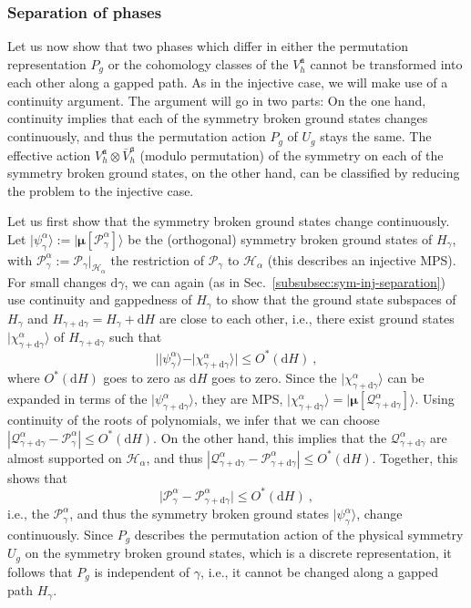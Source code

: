 \documentclass[twocolumn,superscriptaddress,prb,linenumbers]{revtex4-1}
\newcommand{\ket}[1]{\vert#1\rangle}
\newcommand{\MPS}[1]{| {\bm\mu}[#1]\rangle}
\newcommand{\mc}[1]{\mathcal{#1}}
\newcommand{\mf}[1]{\mathfrak{#1}}
\newcommand{\dd}{\mathrm{d}}
\newcommand{\sss}[1]{\subsubsection{#1}}
\begin{document}
\sss{Separation of phases}%
Let us now show that two phases which differ in either the permutation
representation $P_g$ or the cohomology classes of the $V_h^{\mf a}$
cannot be transformed into each other along a gapped path. As in the
injective case, we will make use of a continuity argument. The argument
will go in two parts: On the one hand, continuity implies that each of the
symmetry broken ground states changes continuously, and thus the
permutation action $P_g$ of $U_g$ stays the same. The effective action
$ V_h^{\mf a}\otimes \bar V_h^{\mf a}$ (modulo
permutation) of the symmetry
on each of the symmetry broken ground states, on the other hand, can be
classified by reducing the problem to the injective case.

Let us first show that the symmetry broken ground states change
continuously.  Let $\ket{\psi^\alpha_\gamma}:=\MPS{\mc P^\alpha_\gamma}$ be
the (orthogonal) symmetry broken ground states of $H_\gamma$, with $\mc
    P_\gamma^\alpha:=\mc P_\gamma\vert_{\mc H_\alpha}$ the restriction of $\mc
    P_\gamma$ to $\mc H_\alpha$ (this describes an injective MPS). For small
changes $\dd\gamma$, we can again (as in
Sec.~\ref{subsubsec:sym-inj-separation}) use continuity and gappedness of
$H_\gamma$ to show that the ground state subspaces of $H_\gamma$ and
$H_{\gamma+\dd\gamma}=H_\gamma+\dd H$ are close to each other, i.e., there
exist ground states $\ket{\chi^\alpha_{\gamma+\dd\gamma}}$ of
$H_{\gamma+\dd\gamma}$ such that
\[
    \big|
    \ket{\psi^{\alpha}_\gamma}-
    \ket{\chi^\alpha_{\gamma+\dd\gamma}}
    \big| \le O^*(\dd H)\ ,
\]
where $O^*(\dd H)$ goes to zero as $\dd H$ goes to zero.
Since the $\ket{\chi^\alpha_{\gamma+\dd\gamma}}$ can be expanded in terms of
the $\ket{\psi^\alpha_{\gamma+\dd\gamma}}$, they are MPS,
$\ket{\chi^\alpha_{\gamma+\dd\gamma}}=
    \MPS{\mc Q_{\gamma+\dd\gamma}^\alpha}$.   Using continuity of the
roots of polynomials, we infer that we can choose
$|\mc Q_{\gamma+\dd\gamma}^\alpha-\mc P^\alpha_\gamma|\le O^*(\dd H)$.
On the other hand, this implies that the $\mc
    Q_{\gamma+\dd\gamma}^\alpha$
are almost supported on $\mc H_\alpha$, and thus
$|\mc Q_{\gamma+\dd\gamma}^\alpha-\mc P^\alpha_{\gamma+\dd\gamma}|\le
    O^*(\dd H)$. Together, this shows that
\[
    \big|
    \mc P_{\gamma}^\alpha-
    \mc P^\alpha_{\gamma+\dd\gamma}
    \big|\le O^*(\dd H)\ ,
\]
i.e., the $\mc P^\alpha_\gamma$, and thus the symmetry broken ground
states $\ket{\psi^\alpha_\gamma}$, change continuously.  Since $P_g$
describes the permutation action of the physical symmetry $U_g$ on the
symmetry broken ground states, which is a discrete representation, it follows
that $P_g$ is independent of $\gamma$, i.e., it cannot be changed along a
gapped path $H_\gamma$.
\end{document}
